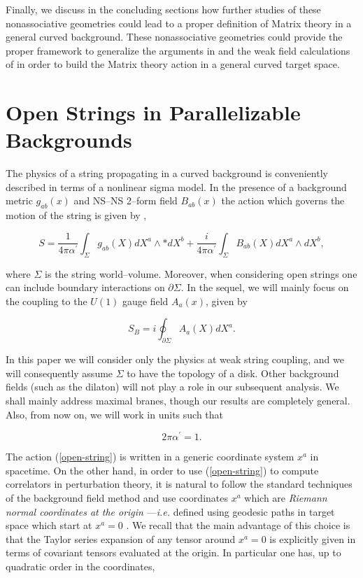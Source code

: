 \documentclass[a4paper,11pt]{article}
\begin{document}
Finally, we discuss in the concluding sections how further studies of
these nonassociative geometries could lead to a proper definition of Matrix
theory \cite{Witten-1, BFSS, DHN, Sen, Seiberg} in a general curved
background. These nonassociative geometries could provide the proper
framework to generalize the arguments in \cite{Douglas-Talk, Douglas-1,
DKO} and the weak field calculations of \cite{Taylor-Raamsdonk-1, DNP} in
order to build the Matrix theory action in a general curved target space.


\section{Open Strings in Parallelizable Backgrounds}


The physics of a string propagating in a curved background is conveniently
described in terms of a nonlinear sigma model. In the presence of a
background metric $g_{ab}\left( x\right)$ and NS--NS 2--form field $B_{ab} 
\left( x\right)$ the action which governs the motion of the string is
given by \cite{AFM, Fradkin-Tseytlin, BCZ, ACNY, CLNY},

\begin{equation}
S=\frac{1}{4\pi \alpha ^{\prime }}\int_{\Sigma }g_{ab}\left( X\right)
dX^{a}\wedge \ast dX^{b}+\frac{i}{4\pi \alpha ^{\prime }}\int_{\Sigma
}B_{ab}\left( X\right) dX^{a}\wedge dX^{b},  \label{open-string}
\end{equation}

\noindent
where $\Sigma$ is the string world--volume. Moreover, when 
considering open strings one can include boundary interactions on $\partial 
\Sigma$. In the sequel, we will mainly focus on the coupling to the $U\left( 
1\right)$ gauge field $A_{a}\left( x\right)$, given by 

$$
S_{B}=i\oint_{\partial \Sigma }A_{a}\left( X\right) dX^{a}.
$$

\noindent
In this paper we will consider only the physics at weak string coupling, and 
we will consequently assume $\Sigma $ to have the topology of a
disk. Other background fields (such as the dilaton) will not play a 
role in our subsequent analysis. We shall mainly address maximal 
branes, though our results are completely general. Also, from now on, we will 
work in units such that

$$
2\pi \alpha ^{\prime }=1.
$$

The action (\ref{open-string}) is written in a generic coordinate system 
$x^{a}$ in spacetime. On the other hand, in order to use (\ref{open-string}) 
to compute correlators in perturbation theory, it is natural to follow the
standard techniques of the background field method and use coordinates 
$x^{a}$ which are \textit{Riemann normal coordinates at the origin} 
---\textit{i.e.} defined using geodesic paths in target space which start 
at $x^{a}=0$ \cite{AFM, BCZ}. We recall that the main advantage of this 
choice is that the Taylor series expansion of any tensor around $x^{a}=0$ 
is explicitly given in terms of covariant tensors evaluated at the origin. 
In particular one has, up to quadratic order in the coordinates, 
\end{document}
